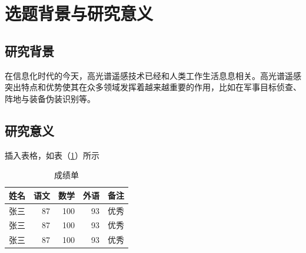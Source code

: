 \documentclass[hyperref,UTF8]{ctexart}
\begin{document}




\fancyhead[L]{} %
\fancyhead[R]{} %
\renewcommand{\headrulewidth}{0pt} 
\fontsize{14.5}{29}\selectfont
\renewcommand*\contentsname{\hfill 目\quad 录 \hfill} 
\tableofcontents
\setcounter{page}{1}						%

\newpage


\fontsize{14.5}{18}\selectfont
\setlength\parskip{0pt} %
\renewcommand{\headrulewidth}{0.4pt} %
\setcounter{page}{1}						%


\section{ 选题背景与研究意义}
\subsection{研究背景}
在信息化时代的今天，高光谱遥感技术已经和人类工作生活息息相关。高光谱遥感突出特点和优势使其在众多领域发挥着越来越重要的作用，比如在军事目标侦查、阵地与装备伪装识别等。
\subsection{ 研究意义}
插入表格，如表（\ref{tab:label1}）所示 \\
\begin{table}[H]
\centering
\caption{成绩单}
	\begin{tabular}{|c|r|r|r|p{4em}|}
	\hline
	姓名 & 语文 & 数学 & 外语 & 备注 \\
	\hline
	张三 & 87 & 100 & 93 & 优秀 \\
	张三 & 87 & 100 & 93 & 优秀 \\
	张三 & 87 & 100 & 93 & 优秀 \\
	\hline
\end{tabular}
\label{tab:label1}
\end{table}
\end{document}
